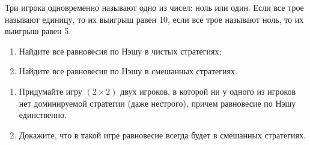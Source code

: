 \begin{problem}
Три игрока одновременно называют одно из чисел: ноль или один. Если все трое называют единицу, то их выигрыш равен 10, если все трое называют ноль, то их выигрыш равен 5.\par
\begin{enumerate}
\item 	Найдите все равновесия по Нэшу в чистых стратегиях;\par
\item 	Найдите все равновесия по Нэшу в смешанных стратегиях.
\end{enumerate}


\begin{sol}

\end{sol}
\end{problem}



\begin{problem}
\begin{source}
\cite{polisci:lectures}
\end{source}
 \begin{enumerate} \item Придумайте игру  $\left(2\times 2\right)$  двух игроков, в которой ни у одного из игроков нет доминируемой стратегии (даже нестрого), причем равновесие по Нэшу единственно.\par
\item 	Докажите, что в такой игре равновесие всегда будет в смешанных стратегиях.
\end{enumerate}


\begin{sol}

\end{sol}
\end{problem}



